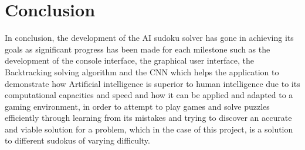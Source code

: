 \documentclass[]{final_report}
\begin{document}
\chapter{Conclusion}
In conclusion, the development of the AI sudoku solver has gone in achieving its goals as significant progress has been made for each milestone such as the development of the console interface, the graphical user interface, the Backtracking solving algorithm and the CNN which helps the application to demonstrate how Artificial intelligence is superior to human intelligence due to its computational capacities and speed and how it can be applied and adapted to a gaming environment, in order to attempt to play games and solve puzzles efficiently through learning from its mistakes and trying to discover an accurate and viable solution for a problem, which in the case of this project, is a solution to different sudokus of varying difficulty.
\end{document}
